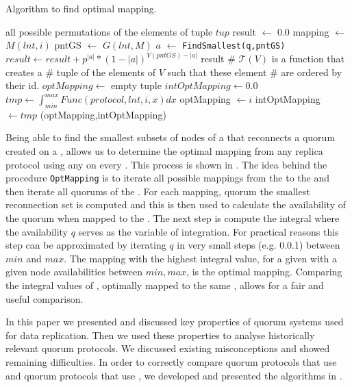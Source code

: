 \documentclass[conference]{IEEEtran}
\begin{document}
\begin{algorithm}[h]
\caption{Algorithm to find optimal mapping.}
\label{alg:optimalmapping}
\begin{algorithmic}[1]
	\State
	\Return all possible permutations of the elements of tuple \(tup\)
\EndProcedure
\State
{}
	\State result \(\leftarrow\) 0.0
	\State mapping \(\leftarrow\) \(M(lnt,i)\)
	\State pntGS \(\leftarrow\) \(G(lnt,M)\)
		\State \(a\) \(\leftarrow\) \texttt{FindSmallest(q,pntGS)}
		\State \(result \leftarrow result + p^{|a|} * (1 - |a|)^{V(pntGS) - |a|}\)
	\EndFor
	\State
	\Return result
\EndProcedure
\State
{}
	\State \# \(\mathcal{T}(V)\) is a function that creates a 
	\State \# tuple of the elements of \(V\) such that these element 
	\State \# are ordered by their id.
	\State
	\State \(optMapping \leftarrow\) empty tuple
	\State \(intOptMapping \leftarrow 0.0\)
		\State \(tmp \leftarrow \int_{min}^{max} Func(protocol,lnt,i,x) dx\)
		\State
			\State optMapping \(\leftarrow i\) 
			\State intOptMapping \(\leftarrow tmp\) 
		\EndIf
	\EndFor
	\State
	\Return (optMapping,intOptMapping)
\EndProcedure
\end{algorithmic}
\end{algorithm}
Being able to find the smallest subsets of nodes of a  that reconnects
a quorum created on a , allows us to determine the optimal mapping from
any replica protocol using any  on every .
This process is shown in .
The idea behind the procedure \texttt{OptMapping} is to iterate all possible
mappings from the  to the  and then iterate all quorums of the
.
For each mapping, quorum the smallest reconnection set is computed and this is
then used to calculate the availability of the quorum when mapped to the
.
The next step is compute the integral where the availability \(q\) serves as
the variable of integration.
For practical reasons this step can be approximated by iterating \(q\) in very
small steps (e.g. 0.0.1) between \(min\) and  \(max\).
The mapping with the highest integral value, for a given  with a given
node availabilities between \(min,max\), is the optimal mapping.
Comparing the integral values of , optimally mapped to the same
, allows for a fair and useful comparison.

In this paper we presented and discussed key properties of quorum systems used
for data replication.
Then we used these properties to analyse historically relevant quorum
protocols.
We discussed existing misconceptions and showed remaining difficulties.
In order to correctly compare quorum protocols that use  and
quorum protocols that use , we developed and presented the
algorithms in .
\end{document}
